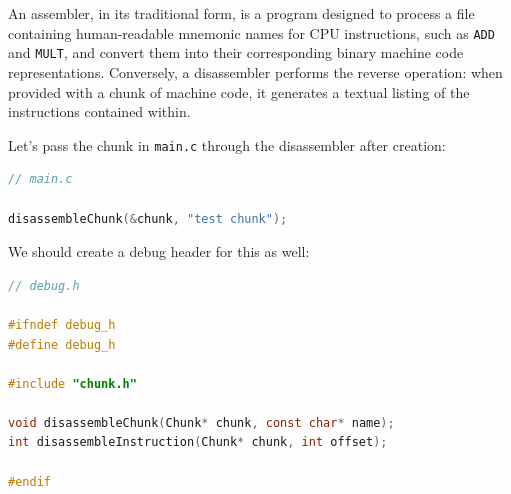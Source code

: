 An assembler, in its traditional form, is a program designed to process a file containing human-readable mnemonic names for CPU instructions, such as \verb.ADD. and \verb.MULT., and convert them into their corresponding binary machine code representations. Conversely, a disassembler performs the reverse operation: when provided with a chunk of machine code, it generates a textual listing of the instructions contained within.

Let's pass the chunk in \verb,main.c, through the disassembler after creation:

\begin{lstlisting}[language=C]
// main.c

disassembleChunk(&chunk, "test chunk");
\end{lstlisting}

We should create a debug header for this as well:

\begin{lstlisting}[language=C]
// debug.h

#ifndef debug_h
#define debug_h

#include "chunk.h"

void disassembleChunk(Chunk* chunk, const char* name);
int disassembleInstruction(Chunk* chunk, int offset);

#endif
\end{lstlisting}






